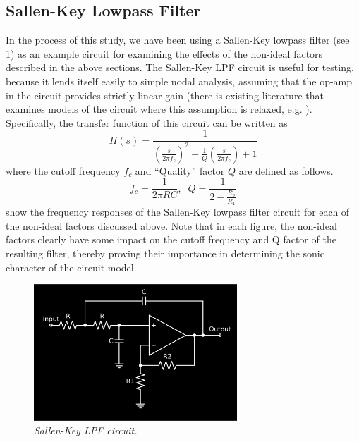 \documentclass[twoside,a4paper]{article}
\begin{document}
\subsection{Sallen-Key Lowpass Filter} \label{sec:SK-LPF}
%
In the process of this study, we have been using a Sallen-Key lowpass
filter \cite{SallenKey} (see \cref{sallenkey}) as an example circuit for
examining the effects of the non-ideal factors described in the above
sections. The Sallen-Key LPF circuit is useful for testing, because it
lends itself easily to simple nodal analysis, assuming that the op-amp
in the circuit provides strictly linear gain (there is existing
literature that examines models of the circuit where this assumption is
relaxed, e.g. \cite{SKF-DAFX}). Specifically, the transfer function of
this circuit can be written as
%
\begin{equation}
    H(s) = \frac{1}{\left(\frac{s}{2\pi f_c} \right)^2
         + \frac{1}{Q}\left(\frac{s}{2\pi f_c} \right) + 1}  
    \label{eq:SKF-transfer}
\end{equation}
%
where the cutoff frequency $f_c$ and ``Quality''
factor $Q$ are defined as follows.
%
\begin{equation}
    f_c = \frac{1}{2\pi RC}, \;\;
    Q = \frac{1}{2 - \frac{R_2}{R_1}}
    \label{eq:SKF-params}
\end{equation}
%
 show the
frequency responses of the Sallen-Key lowpass filter circuit for
each of the non-ideal factors discussed above. Note that in each figure,
the non-ideal factors clearly have some impact on the cutoff frequency
and Q factor of the resulting filter, thereby proving their importance
in determining the sonic character of the circuit model.
%
\begin{figure}[h]
    \center
    \includegraphics[width=3in]{../CMTolerance/Pics/sallen-key.png}
    \caption{\label{sallenkey}{\it Sallen-Key LPF circuit.}}
\end{figure}
%
\end{document}
